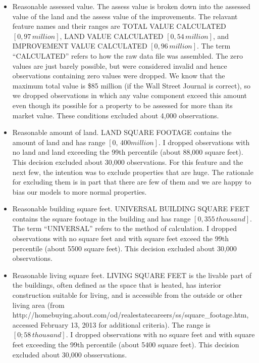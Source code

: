 \begin{itemize}
\item Reasonable assessed value. The assess value is broken down into
  the assessed value of the land and the assess value of the
  improvements. The relavant feature names and their ranges are TOTAL
  VALUE CALCULATED $[0, 97 \, million]$, LAND VALUE CALCULATED $[0, 54
  \, million]$, and IMPROVEMENT VALUE CALCULATED $[0,96 \,
  million]$. The term ``CALCULATED'' refers to how the raw data file
  was assembled.  The zero values are just barely possible, but were
  considered invalid and hence observations containing zero values
  were dropped. We know that the maximum total value is \$85 million 
  (if the Wall Street Journal is correct),
  so we dropped observations in which any value component exceed this
  amount even though its possible for a property to be assessed for
  more than its market value. These conditions excluded about 4,000
  observations.

\item Reasonable amount of land. LAND SQUARE FOOTAGE contains the
  amount of land and has range $[0, \, 400 million]$. I dropped
  observations with no land and land exceeding the 99th percentile
  (about 88,000 square feet). This decision excluded about 30,000
  observations. For this feature and the next few, the intention 
  was to exclude properties that are huge. The rationale for
  excluding them is in part that there are few of them and we are happy
  to bias our models to more normal properties.

\item Reasonable building square feet. UNIVERSAL BUILDING SQUARE FEET
  contains the square footage in the building and has range $[0,
  355 \, thousand]$. The term ``UNIVERSAL'' refers to the method of
  calculation. I dropped observations with no square feet and with
  square feet exceed the 99th percentile (about 5500 square feet). This
  decision excluded about 30,000 observations.

\item Reasonable living square feet. LIVING SQUARE FEET is the livable
  part of the buildings, often defined as the space that is heated,
  has interior construction suitable for living, and is accessible
  from the outside or other living area (from
  http://homebuying.about.com/od/realestatecareers/ss/square\_footage.htm,
  accessed February 13, 2013 for additional criteria). The range is
  $[0; 58 \, thousand]$. I dropped observations with no square feet
  and with square feet exceeding the 99th percentile (about 5400
  square feet). This decision excluded about 30,000 obsservations.


\end{itemize}
